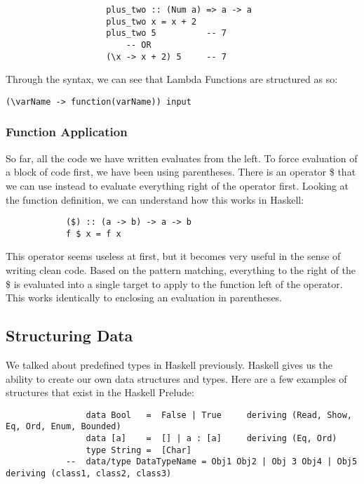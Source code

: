 \documentclass{article}
\begin{document}
            \begin{lstlisting}
                    plus_two :: (Num a) => a -> a
                    plus_two x = x + 2
                    plus_two 5          -- 7
                        -- OR
                    (\x -> x + 2) 5     -- 7
            \end{lstlisting}
            
            \medskip\noindent
            Through the syntax, we can see that Lambda Functions are structured as so: 
            
            \smallskip
            \lstinline{(\varName -> function(varName)) input}
            
        \subsubsection{Function Application}
        So far, all the code we have written evaluates from the left. To force evaluation of a block of code first, we have been using parentheses. There is an operator \$ that we can use instead to evaluate everything right of the operator first. Looking at the function definition, we can understand how this works in Haskell:
        
        \begin{lstlisting}
            ($) :: (a -> b) -> a -> b  
            f $ x = f x
        \end{lstlisting}
        
        \medskip\noindent
        This operator seems useless at first, but it becomes very useful in the sense of writing clean code. Based on the pattern matching, everything to the right of the \$ is evaluated into a single target to apply to the function left of the operator. This works identically to enclosing an evaluation in parentheses.
            
    \subsection{Structuring Data}
    We talked about predefined types in Haskell previously. Haskell gives us the ability to create our own data structures and types. Here are a few examples of structures that exist in the Haskell Prelude:
    
            \begin{lstlisting}
                data Bool   =  False | True     deriving (Read, Show, Eq, Ord, Enum, Bounded)
                data [a]    =  [] | a : [a]     deriving (Eq, Ord)
                type String =  [Char]
            --  data/type DataTypeName = Obj1 Obj2 | Obj 3 Obj4 | Obj5  deriving (class1, class2, class3)
            \end{lstlisting}
            
\end{document}
